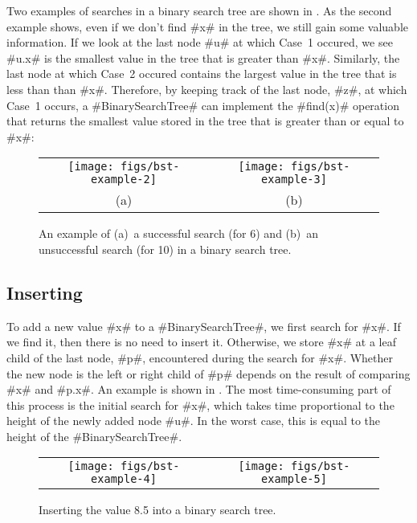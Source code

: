 Two examples of searches in a binary search tree are shown in
.  As the second example shows, even if we don't find #x#
in the tree, we still gain some valuable information.  If we look at
the last node #u# at which Case~1 occured, we see #u.x# is the smallest
value in the tree that is greater than #x#.  Similarly, the last node
at which Case~2 occured contains the largest value in the tree that is
less than than #x#.  Therefore, by keeping track of the last node, #z#,
at which Case~1 occurs, a #BinarySearchTree# can implement the #find(x)#
operation that returns the smallest value stored in the tree that is
greater than or equal to #x#:

\begin{figure}
  \begin{center}
    \begin{tabular}{cc}
    \texttt{[image: figs/bst-example-2]} &
    \texttt{[image: figs/bst-example-3]} \\
    (a) & (b)
    \end{tabular}
  \end{center}
  \caption{An example of (a)~a successful search (for 6) and (b)~an unsuccessful search (for 10) in a binary search tree.}
\end{figure}


\subsection{Inserting}

To add a new value #x# to a #BinarySearchTree#, we first search for
#x#. If we find it, then there is no need to insert it.  Otherwise,
we store #x# at a leaf child of the last node, #p#, encountered during the
search for #x#. Whether the new node is the left or right child of #p# depends on the result of comparing #x# and #p.x#.
An example is shown in . The most time-consuming
part of this process is the initial search for #x#, which takes time
proportional to the height of the newly added node #u#.  In the worst
case, this is equal to the height of the #BinarySearchTree#.

\begin{figure}
  \begin{center}
    \begin{tabular}{cc}
    \texttt{[image: figs/bst-example-4]} &
    \texttt{[image: figs/bst-example-5]} 
    \end{tabular}
  \end{center}
  \caption{Inserting the value 8.5 into a binary search tree.}
\end{figure}


